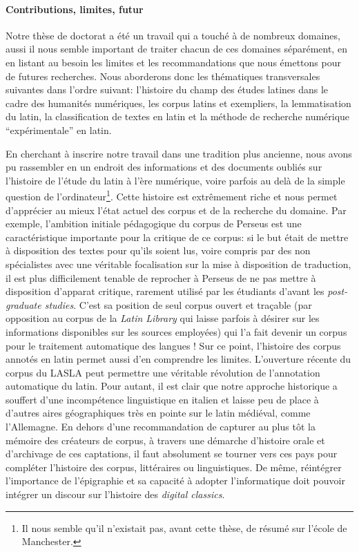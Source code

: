 \paragraph{Contributions, limites, futur}

Notre thèse de doctorat a été un travail qui a touché à de nombreux domaines, aussi il nous semble important de traiter chacun de ces domaines séparément, en en listant au besoin les limites et les recommandations que nous émettons pour de futures recherches. Nous aborderons donc les thématiques transversales suivantes dans l'ordre suivant: l'histoire du champ des études latines dans le cadre des humanités numériques, les corpus latins et exempliers, la lemmatisation du latin, la classification de textes en latin et la méthode de recherche numérique \enquote{expérimentale} en latin.

En cherchant à inscrire notre travail dans une tradition plus ancienne, nous avons pu rassembler en un endroit des informations et des documents oubliés sur l'histoire de l'étude du latin à l'ère numérique, voire parfois au delà de la simple question de l'ordinateur\footnote{Il nous semble qu'il n'existait pas, avant cette thèse, de résumé sur l'école de Manchester.}. Cette histoire est extrêmement riche et nous permet d'apprécier au mieux l'état actuel des corpus et de la recherche du domaine. Par exemple, l'ambition initiale pédagogique du corpus de Perseus est une caractéristique importante pour la critique de ce corpus: si le but était de mettre à disposition des textes pour qu'ils soient lus, voire compris par des non spécialistes avec une véritable focalisation sur la mise à disposition de traduction, il est plus difficilement tenable de reprocher à Perseus de ne pas mettre à disposition d'apparat critique, rarement utilisé par les étudiants d'avant les \textit{post-graduate studies}. C'est sa position de seul corpus ouvert et traçable (par opposition au corpus de la \textit{Latin Library} qui laisse parfois à désirer sur les informations disponibles sur les sources employées) qui l'a fait devenir un corpus pour le traitement automatique des langues ! Sur ce point, l'histoire des corpus annotés en latin permet aussi d'en comprendre les limites. L'ouverture récente du corpus du LASLA peut permettre une véritable révolution de l'annotation automatique du latin. Pour autant, il est clair que notre approche historique a souffert d'une incompétence linguistique en italien et laisse peu de place à d'autres aires géographiques très en pointe sur le latin médiéval, comme l'Allemagne. En dehors d'une recommandation de capturer au plus tôt la mémoire des créateurs de corpus, à travers une démarche d'histoire orale et d'archivage de ces captations, il faut absolument se tourner vers ces pays pour compléter l'histoire des corpus, littéraires ou linguistiques. De même, réintégrer l'importance de l'épigraphie et sa capacité à adopter l'informatique doit pouvoir intégrer un discour sur l'histoire des \textit{digital classics}.

